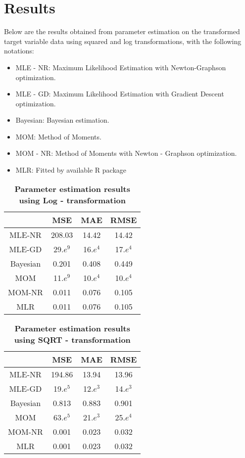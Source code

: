 \documentclass[12pt]{article}
\begin{document}
	\section{Results}
	
	Below are the results obtained from parameter estimation on the transformed target variable data using squared and log transformations, with the following notations:
	
	\begin{itemize}
		\item 	MLE - NR: Maximum Likelihood Estimation with Newton-Graphson optimization.
		\item 	MLE - GD: Maximum Likelihood Estimation with Gradient Descent optimization.
		\item Bayesian: Bayesian estimation. 
		\item MOM: Method of Moments.
		\item MOM - NR: Method of Moments with Newton - Graphson optimization.
		\item MLR: Fitted by available R package
		
	\end{itemize}
	
\begin{table}[h]
	\centering
\begin{tabular}{|c|c|c|c|}
	\hline
	& MSE & MAE & RMSE \\
	\hline
	MLE-NR & 208.03 & 14.42 & 14.42 \\
	\hline
	MLE-GD & 29.$e^{9}$ & 16.$e^{4}$ & 17.$e^{4}$ \\
	\hline
	Bayesian & 0.201 & 0.408 & 0.449 \\
	\hline
	MOM & 11.$e^{9}$ & 10.$e^{4}$ & 10.$e^{4}$ \\
	\hline
	MOM-NR & 0.011 & 0.076 & 0.105 \\
	\hline
	MLR & 0.011 & 0.076 & 0.105 \\
	\hline
\end{tabular}
	\caption{\textbf{Parameter estimation results using Log - transformation}}
\label{tab:log-trans}
\end{table}
	
	\begin{table}[h]
		\centering
				\begin{tabular}{|c|c|c|c|}
			\hline
			& MSE & MAE & RMSE \\
			\hline
			MLE-NR & 194.86 & 13.94 & 13.96 \\
			\hline
			MLE-GD & 19.$e^{5}$ & 12.$e^{3}$ & 14.$e^{3}$ \\
			\hline
			Bayesian & 0.813 & 0.883 & 0.901 \\
			\hline
			MOM & 63.$e^{5}$ & 21.$e^{3}$ & 25.$e^{4}$ \\
			\hline
			MOM-NR & 0.001 & 0.023 & 0.032 \\
			\hline
			MLR & 0.001 & 0.023 & 0.032 \\
			\hline
		\end{tabular}
		\caption{\textbf{Parameter estimation results using SQRT - transformation}}
		\label{tab:sqrt-trans}
		\end{table}
	
\end{document}
